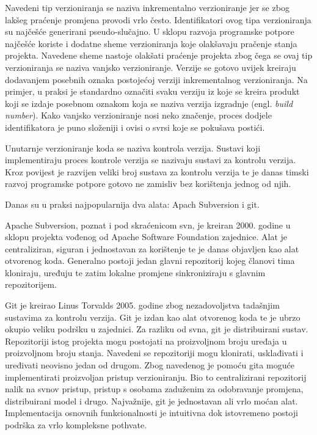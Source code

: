 \documentclass[times, utf8, diplomski, numeric]{fer}
\newcommand{\eng}[1]{(engl. \textit{#1})}
\begin{document}
Navedeni tip verzioniranja se naziva inkrementalno verzioniranje jer se zbog lakšeg praćenje promjena provodi vrlo često. Identifikatori ovog tipa verzioniranja su najčešće generirani pseudo-slučajno. U sklopu razvoja programske potpore najčešće koriste i dodatne sheme verzioniranja koje olakšavaju pračenje stanja projekta. Navedene sheme nastoje olakšati praćenje projekta zbog čega se ovaj tip verzioniranja se naziva vanjsko verzioniranje. Verzije se gotovo uvijek kreiraju dodavanjem posebnih oznaka postojećoj verziji inkrementalnog verzioniranja. Na primjer, u praksi je standardno označiti svaku verziju iz koje se kreira produkt koji se izdaje posebnom oznakom koja se naziva verzija izgradnje \eng{build number}. Kako vanjsko verzioniranje nosi neko značenje, proces dodjele identifikatora je puno složeniji i ovisi o svrsi koje se pokušava postići.

Unutarnje verzioniranje koda se naziva kontrola verzija\citep{wiki:VersionControl}. Sustavi koji implementiraju proces kontrole verzija se nazivaju sustavi za kontrolu verzija. Kroz povijest je razvijen veliki broj sustava za kontrolu verzija te je danas timski razvoj programske potpore gotovo ne zamisliv bez korištenja jednog od njih.

Danas su u praksi najpopularnija dva alata: Apach Subversion i git.

Apache Subversion, poznat i pod skraćenicom svn, je kreiran 2000. godine u sklopu projekta vođenog od Apache Software Foundation zajednice. Alat je centraliziran, siguran i jednostavan za korištenje te je danas objavljen kao alat otvorenog koda. Generalno postoji jedan glavni repozitorij kojeg članovi tima kloniraju, uređuju te zatim lokalne promjene sinkroniziraju s glavnim repozitorijem.

Git je kreirao Linus Torvalds 2005. godine zbog nezadovoljstva tadašnjim sustavima za kontrolu verzija. Git je izdan kao alat otvorenog koda te je ubrzo okupio veliku podršku u zajednici. Za razliku od svna, git je distribuirani sustav. Repozitoriji istog projekta mogu postojati na proizvoljnom broju uređaja u proizvoljnom broju stanja. Navedeni se repozitoriji mogu klonirati, usklađivati i uređivati neovisno jedan od drugom. Zbog navedenog je pomoću gita moguće implementirati proizvoljan pristup verzioniranju. Bio to centralizirani repozitorij nalik na svnov pristup, pristup s osobama zaduženim za odobravanje promjena, distribuirani model i drugo. Najvažnije, git je jednostavan ali vrlo moćan alat. Implementacija osnovnih funkcionalnosti je intuitivna dok istovremeno postoji podrška za vrlo kompleksne pothvate.
\end{document}
